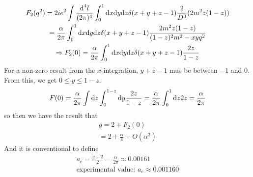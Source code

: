 \documentclass[]{scrartcl}
\begin{document}
\begin{gather}
	 F_2(q^2) = 2ie^2 \int \frac{\text d^4l}{(2\pi)^4}\int_0^1 \text dx\text dy\text dz \delta(x+y+z-1) \frac{2}{D^3}(2m^2z(1-z))\\
	 = \frac{\alpha}{2\pi} \int_0^1 \text dx\text dy \text dz \delta(x+y+z-1)\frac{2m^2z(1-z)}{(1-z)^2m^2 - xyq^2}\\
	 \Rightarrow F_2(0) = \frac{\alpha}{2\pi} \int_0^1 \text dx\text dy\text dz \delta(x+y+z-1) \frac{2z}{1-z}
\end{gather}
For a non-zero result from the $x$-integration, $y+z-1$ mus be between $-1$ and $0$. From this, we get $0 \leq y \leq 1-z$.
\begin{gather}
	F(0) = \frac{\alpha}{2\pi} \int \text dz \int_0^{1-z}\text dy \frac{2z}{1-z} = \frac{\alpha}{2\pi}\int_0^1 \text dz 2z = \frac{\alpha}{2\pi}
\end{gather}
so then we have the result that
\begin{gather}
	g = 2 + F_2(0)\\
	= 2 + \frac{\alpha}{\pi} + O(\alpha^2)
\end{gather}
And it is conventional to define
\begin{gather}
	a_e = \frac{g-2}{2} = \frac{\alpha}{2\pi} \approx 0.00161\\
	\text{experimental value: } a_e \approx 0.001160
\end{gather}
\end{document}
